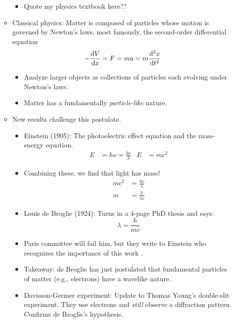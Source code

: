 \documentclass[../finalProject.tex]{subfiles}
\begin{document}
\begin{itemize}
\begin{itemize}
        \begin{itemize}
            \item Quote my physics textbook here??
        \end{itemize}
        \item Classical physics: Matter is composed of particles whose motion is governed by Newton's laws, most famously, the second-order differential equation
        \begin{equation*}
            -\dv{V}{x} = F 
            = ma
            = m\dv[2]{x}{t}
        \end{equation*}
        \begin{itemize}
            \item Analyze larger objects as collections of particles each evolving under Newton's laws.
            \item Matter has a fundamentally \emph{particle-like} nature.
        \end{itemize}
        \item New results challenge this postulate.
        \begin{itemize}
            \item Einstein (1905): The photoelectric effect equation and the mass-energy equation.
            \begin{align*}
                E &= h\nu = \frac{hc}{\lambda}&
                E &= mc^2
            \end{align*}
            \item Combining these, we find that light has mass!
            \begin{align*}
                mc^2 &= \frac{hc}{\lambda}\\
                m &= \frac{h}{\lambda c}
            \end{align*}
            \item Louis de Broglie (1924): Turns in a 4-page PhD thesis and says:
            \begin{equation*}
                \lambda = \frac{h}{mc}
            \end{equation*}
            \item Paris committee will fail him, but they write to Einstein who recognizes the importance of this work \parencite[7]{bib:CHEM26100Notes}.
            \item Takeaway: de Broglie has just postulated that fundamental particles of matter (e.g., electrons) have a wavelike nature.
            \item Davisson-Germer experiment: Update to Thomas Young's double-slit experiment. They use electrons and \emph{still} observe a diffraction pattern. Confirms de Broglie's hypothesis.

\end{itemize}
\end{itemize}
\end{itemize}
\end{document}
